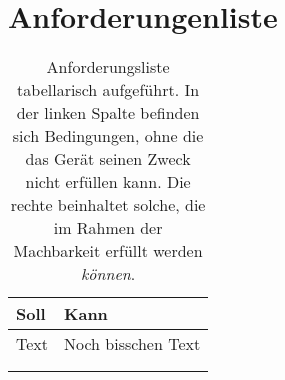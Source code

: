 \chapter{Anforderungenliste}
\begin{table}[h]
	\centering
	\caption{Anforderungsliste tabellarisch aufgeführt. In der linken Spalte befinden sich Bedingungen, ohne die das Gerät seinen Zweck
	nicht erfüllen kann. Die rechte beinhaltet solche, die im Rahmen der Machbarkeit erfüllt werden \textit{können}.}
	\begin{tabular}{@{}ll@{}}
		\toprule
		Soll & Kann \\
		\midrule
		Text & Noch bisschen Text \\
		&  \\
		&  \\
		\bottomrule
	\end{tabular}
\end{table}